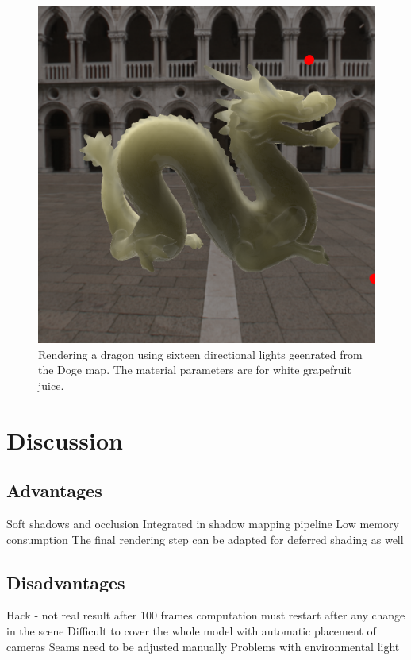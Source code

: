 \begin{figure}
\centering

\includegraphics[width=0.9 \linewidth]{images/results/skymap_1.png}
\caption{Rendering a dragon using sixteen directional lights geenrated from the Doge map. The material parameters are for white grapefruit juice.}
\label{fig:doge_render_grape}
\end{figure}

\section{Discussion}
\subsection{Advantages}
Soft shadows and occlusion
Integrated in shadow mapping pipeline
Low memory consumption
The final rendering step can be adapted for deferred shading as well


\subsection{Disadvantages}
Hack - not real result after 100 frames
computation must restart after any change in the scene
Difficult to cover the whole model with automatic placement of cameras
Seams need to be adjusted manually
Problems with environmental light
